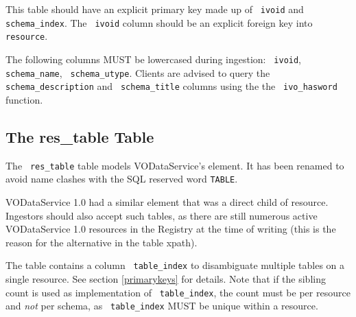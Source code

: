 \documentclass[11pt,a4paper]{ivoa}
\newcommand{\rtent}[1]{\texttt{\color{rtcolor} #1}}
\begin{document}

 

This table should have an explicit primary key made up of
\rtent{ivoid} and \rtent{schema\_index}.  The
\rtent{ivoid}  column should be an explicit foreign key into
\rtent{resource}.

The following columns MUST be lowercased during ingestion:
\rtent{ivoid}, \rtent{schema\_name}, \rtent{schema\_utype}.
Clients are advised to query the \rtent{schema\_description} 
and \rtent{schema\_title} columns
using the the \rtent{ivo\_hasword} function.



\subsection{The res\_table Table}

\label{table_res_table}

The \rtent{res\_table} table models VODataService's
 element.  It has been renamed to avoid name clashes
with the SQL reserved word \texttt{TABLE}.

VODataService 1.0 had a similar element that was a direct child of
resource.  Ingestors should also accept such tables, as there are still
numerous active VODataService 1.0 resources in the Registry at the time
of writing (this is the reason for the alternative in the table xpath).

The table contains a column \rtent{table\_index} to disambiguate
multiple tables on a single resource.  See section \ref{primarykeys} for details.  Note that if the sibling
count is used as implementation of \rtent{table\_index}, the count
must be per resource and \emph{not} per schema, as
\rtent{table\_index} MUST be unique within a resource.


\end{document}
